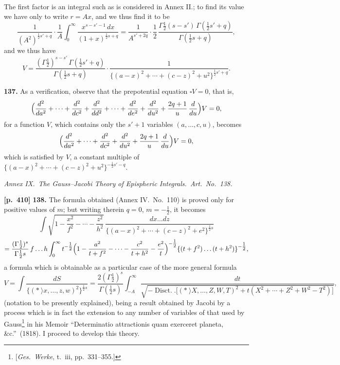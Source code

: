\documentclass[11pt,a4paper]{article}
\providecommand{\Disct}{\operatorname{Disct.}}
\begin{document}
The first factor is an integral such as is considered in Annex II.; to find its value we have only to write $r = Ax$, and we thus find it to be
\[
\frac{1}{(A^{2})^{\tfrac{1}{2}s'+q}}\cdot\frac{1}{A}\int_{0}^{\infty}\frac{x^{s-s'-1}\,dx}{(1+x)^{\tfrac{1}{2}s+q}} = \frac{1}{A^{s'+2q}}\cdot\frac{1}{2}\,\frac{\Gamma\tfrac{1}{2}(s-s')\,\Gamma(\tfrac{1}{2}s'+q)}{\Gamma(\tfrac{1}{2}s+q)},
\]
and we thus have
\[
V = \frac{(\Gamma\tfrac{1}{2})^{s-s'}\,\Gamma(\tfrac{1}{2}s'+q)}{\Gamma(\tfrac{1}{2}s+q)}\cdot\frac{1}{\{(a-x)^{2}+\cdots+(c-z)^{2}+u^{2}\}^{\tfrac{1}{2}s'+q}}.
\]

\textbf{137.} As a verification, observe that the prepotential equation $\square V = 0$, that is,
\[
\Bigl(\frac{d^{2}}{da^{2}}+\cdots+\frac{d^{2}}{dc^{2}}+\frac{d^{2}}{dd^{2}}+\cdots+\frac{d^{2}}{de^{2}}+\frac{d^{2}}{du^{2}}+\frac{2q+1}{u}\,\frac{d}{du}\Bigr)V = 0,
\]
for a function $V$, which contains only the $s'+1$ variables $(a,\ldots,c,u)$, becomes
\[
\Bigl(\frac{d^{2}}{da^{2}}+\cdots+\frac{d^{2}}{dc^{2}}+\frac{d^{2}}{du^{2}}+\frac{2q+1}{u}\,\frac{d}{du}\Bigr)V = 0,
\]
which is satisfied by $V$, a constant multiple of $\bigl\{(a-x)^{2}+\cdots+(c-z)^{2}+u^{2}\bigr\}^{-\tfrac{1}{2}s'-q}$.

\bigskip
\begin{center}
\textit{Annex IX.\ The Gauss--Jacobi Theory of Epispheric Integrals.\ Art.\ No.\ 138.}
\end{center}

\bigskip
\noindent\textbf{[p.~410]}\quad
\textbf{138.} The formula obtained (Annex IV.\ No.\ 110) is proved only for positive values of $m$; but writing therein $q = 0$, $m = -\tfrac{1}{2}$, it becomes
\[
\int \sqrt{1 - \frac{x^{2}}{f^{2}} - \cdots - \frac{z^{2}}{h^{2}}}\,\frac{dx\ldots dz}{\{(a-x)^{2}+\cdots+(c-z)^{2}+e^{2}\}^{\tfrac{1}{2}s}}
\]
\[
= \frac{(\Gamma\tfrac{1}{2})^{s}}{\Gamma\tfrac{1}{2}s}\,f\ldots h\int_{0}^{\infty} t^{-\tfrac{1}{2}}\Bigl(1 - \frac{a^{2}}{t+f^{2}} - \cdots - \frac{c^{2}}{t+h^{2}} - \frac{e^{2}}{t}\Bigr)^{-\tfrac{1}{2}}\{(t+f^{2})\ldots(t+h^{2})\}^{-\tfrac{1}{2}},
\]
a formula which is obtainable as a particular case of the more general formula
\[
V = \int \frac{dS}{\{(*\!\!\:\rangle\!x,\ldots,z,w)^{2}\}^{\tfrac{1}{2}s}} = \frac{2(\Gamma\tfrac{1}{2})^{s}}{\Gamma(\tfrac{1}{2}s)}\int_{-A}^{\infty}\frac{dt}{\sqrt{-\Disct.\bigl[(*\!\!\:\rangle\!X,\ldots,Z,W,T)^{2} + t(X^{2}+\cdots+Z^{2}+W^{2}-T^{2})\bigr]}},
\]
(notation to be presently explained), being a result obtained by Jacobi by a process which is in fact the extension to any number of variables of that used by Gauss\footnote{[\textit{Ges.\ Werke}, t.\ iii, pp.\ 331--355.]} in his Memoir ``Determinatio attractionis quam exerceret planeta, \&c.''\ (1818). I proceed to develop this theory.
\end{document}
